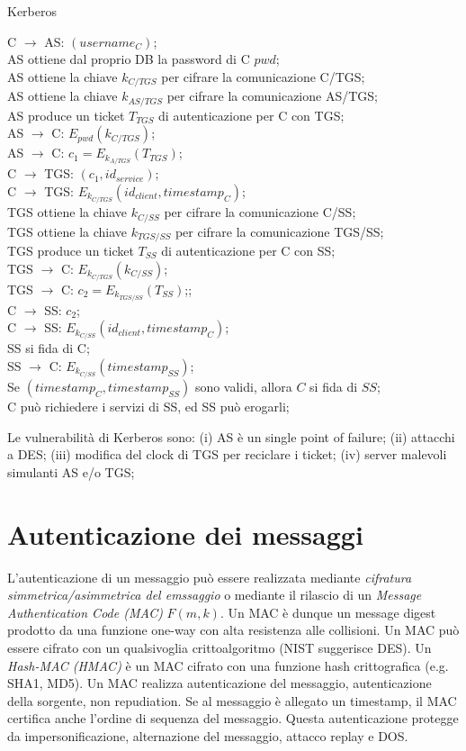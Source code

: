 \bigskip
\begin{algorithm}[H]
  \caption{Kerberos}
  \label{alg:kerberos}
  \SetAlgoNoLine
  C $\rightarrow$ AS: $(username_{C})$;\\
  AS ottiene dal proprio DB la password di C $pwd$;\\
  AS ottiene la chiave $k_{C/TGS}$ per cifrare la comunicazione C/TGS;\\
  AS ottiene la chiave $k_{AS/TGS}$ per cifrare la comunicazione AS/TGS;\\
  AS produce un ticket $T_{TGS}$ di autenticazione per C con TGS;\\
  AS $\rightarrow$ C: $E_{pwd}(k_{C/TGS})$;\\
  AS $\rightarrow$ C: $c_{1}=E_{k_{A/TGS}}(T_{TGS})$;\\
  C $\rightarrow$ TGS: $(c_{1},id_{service})$;\\
  C $\rightarrow$ TGS: $E_{k_{C/TGS}}(id_{client},timestamp_{C})$;\\
  TGS ottiene la chiave $k_{C/SS}$ per cifrare la comunicazione C/SS;\\
  TGS ottiene la chiave $k_{TGS/SS}$ per cifrare la comunicazione TGS/SS;\\
  TGS produce un ticket $T_{SS}$ di autenticazione per C con SS;\\
  TGS $\rightarrow$ C: $E_{k_{C/TGS}}(k_{C/SS})$;\\
  TGS $\rightarrow$ C: $c_{2}=E_{k_{TGS/SS}}(T_{SS})$;;\\
  C $\rightarrow$ SS: $c_{2}$;\\
  C $\rightarrow$ SS: $E_{k_{C/SS}}(id_{client},timestamp_{C})$;\\
  SS si fida di C;\\
  SS $\rightarrow$ C: $E_{k_{C/SS}}(timestamp_{SS})$;\\
  Se $(timestamp_{C},timestamp_{SS})$ sono validi, allora $C$ si fida di $SS$;\\
  C può richiedere i servizi di SS, ed SS può erogarli;
\end{algorithm}

Le vulnerabilità di Kerberos sono:
(i) AS è un single point of failure;
(ii) attacchi a DES;
(iii) modifica del clock di TGS per reciclare i ticket;
(iv) server malevoli simulanti AS e/o TGS;


\section{Autenticazione dei messaggi}
L'autenticazione di un messaggio può essere realizzata mediante \textit{cifratura simmetrica/asimmetrica del emssaggio} o mediante il rilascio di un \textit{Message Authentication Code (MAC)} $F(m,k)$.
Un MAC è dunque un message digest prodotto da una funzione one-way con alta resistenza alle collisioni. Un MAC può essere cifrato con un qualsivoglia crittoalgoritmo (NIST suggerisce DES).
Un \textit{Hash-MAC (HMAC)} è un MAC cifrato con una funzione hash crittografica (e.g. SHA1, MD5).
Un MAC realizza autenticazione del messaggio, autenticazione della sorgente, non repudiation. Se al messaggio è allegato un timestamp, il MAC certifica anche l'ordine di sequenza del messaggio.
Questa autenticazione protegge da impersonificazione, alternazione del messaggio, attacco replay e DOS.
